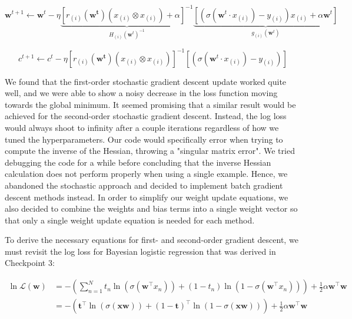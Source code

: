 \documentclass[11pt]{extarticle}
\begin{document}
\begin{equation}
\mathbf{w}^{t+1} \leftarrow \mathbf{w}^{t} - \eta \underbrace{\left[r_{(i)}(\mathbf{w^t}) (x_{(i)} \otimes x_{(i)}) + \alpha \right]^{-1}}_{H_{(i)}(\mathbf{w}^t)^{-1}} \underbrace{\left[ \left(\sigma(\mathbf{w}^t \cdot x_{(i)}) - y_{(i)}\right) x_{(i)} + \alpha \mathbf{w}^{t} \right]}_{g_{(i)}(\mathbf{w}^t)}
\end{equation}

\begin{equation}
c^{t+1} \leftarrow c^{t} - \eta \left[ r_{(i)}(\mathbf{w^t}) (x_{(i)} \otimes x_{(i)}) \right]^{-1} \left[ \left(\sigma(\mathbf{w}^t \cdot x_{(i)}) - y_{(i)}\right) \right]
\end{equation}

We found that the first-order stochastic gradient descent update worked quite well, and we were able to show a noisy decrease in the loss function moving towards the global minimum. It seemed promising that a similar result would be achieved for the second-order stochastic gradient descent. Instead, the log loss would always shoot to infinity after a couple iterations regardless of how we tuned the hyperparameters. Our code would specifically error when trying to compute the inverse of the Hessian, throwing a "singular matrix error". We tried debugging the code for a while before concluding that the inverse Hessian calculation does not perform properly when using a single example. Hence, we abandoned the stochastic approach and decided to implement batch gradient descent methods instead. In order to simplify our weight update equations, we also decided to combine the weights and bias terms into a single weight vector so that only a single weight update equation is needed for each method.

To derive the necessary equations for first- and second-order gradient descent, we must revisit the log loss for Bayesian logistic regression that was derived in Checkpoint 3:

\begin{align}
    \ln \mathcal{L}(\mathbf{w}) &= - \left( \sum_{n=1}^N t_n\ln (\sigma(\textbf{w}^\top x_n)) + (1-t_n) \ln (1-\sigma(\textbf{w}^\top x_n)) \right) + \frac{1}{2} \alpha \mathbf{w}^\top \mathbf{w} \\
    &= - \left( \mathbf{t}^\top \ln (\sigma(\mathbf{x} \mathbf{w})) + (1-\mathbf{t})^\top \ln (1-\sigma(\mathbf{x} \mathbf{w})) \right) + \frac{1}{2} \alpha \mathbf{w}^\top \mathbf{w}
\end{align}
\end{document}
